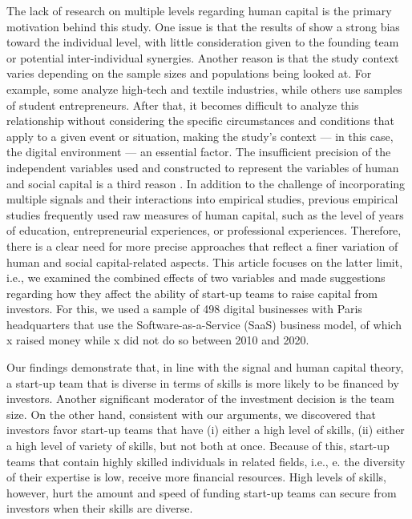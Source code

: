 \documentclass[12pt]{article}
\begin{document}
The lack of research on multiple levels regarding human capital is the primary motivation behind this study. One issue is that the results of \citep{marvel2016human} show a strong bias toward the individual level, with little consideration given to the founding team or potential inter-individual synergies. Another reason is that the study context varies depending on the sample sizes and populations being looked at. For example, some analyze high-tech and textile industries, while others use samples of student entrepreneurs. After that, it becomes difficult to analyze this relationship without considering the specific circumstances and conditions that apply to a given event or situation, making the study's context — in this case, the digital environment — an essential factor. The insufficient precision of the independent variables used and constructed to represent the variables of human and social capital is a third reason \citep{harrison2007s}. In addition to the challenge of incorporating multiple signals and their interactions into empirical studies, previous empirical studies frequently used raw measures of human capital, such as the level of years of education, entrepreneurial experiences, or professional experiences. Therefore, there is a clear need for more precise approaches that reflect a finer variation of human and social capital-related aspects. This article focuses on the latter limit, i.e., we examined the combined effects of two variables and made suggestions regarding how they affect the ability of start-up teams to raise capital from investors. For this, we used a sample of 498 digital businesses with Paris headquarters that use the Software-as-a-Service (SaaS) business model, of which x raised money while x did not do so between 2010 and 2020.

Our findings demonstrate that, in line with the signal and human capital theory, a start-up team that is diverse in terms of skills is more likely to be financed by investors. Another significant moderator of the investment decision is the team size. On the other hand, consistent with our arguments, we discovered that investors favor start-up teams that have (i) either a high level of skills, (ii) either a high level of variety of skills, but not both at once. Because of this, start-up teams that contain highly skilled individuals in related fields, i.e., e. the diversity of their expertise is low, receive more financial resources. High levels of skills, however, hurt the amount and speed of funding start-up teams can secure from investors when their skills are diverse.
\end{document}
